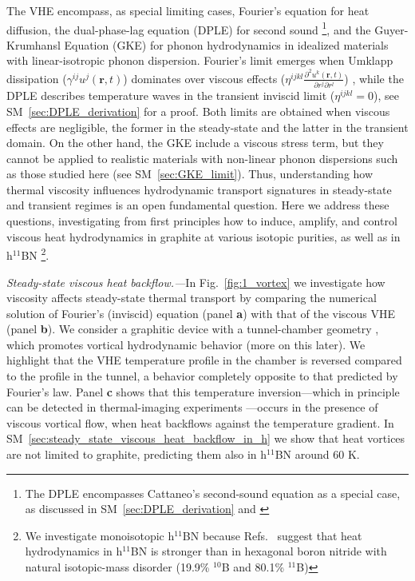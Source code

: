 \documentclass[
prb,
twocolumn,
superscriptaddress,
 amsmath,amssymb,
 aps,
longbibliography,
]{revtex4-2}
\begin{document}
The VHE encompass, as special limiting cases, Fou\-rier's equation for heat diffusion, the dual-phase-lag equation (DPLE) \cite{joseph_heat_1989,tzou_unified_1995} for second sound \footnote{The DPLE encompasses Cattaneo's second-sound equation \cite{cattaneo1958form} as a special case, as discussed in SM~\ref{sec:DPLE_derivation} and \cite{tzou_unified_1995}}, and the Guyer-Krumhansl Equation (GKE) \cite{guyer_solution_1966} for phonon hydrodynamics in idealized materials with linear-isotropic phonon dispersion.
Fourier's limit emerges when Umklapp dissipation ($\gamma^{ij}u^j(\bm{r}, t)$) dominates over viscous effects ($\eta^{ijkl}\tfrac{\partial^2 u^k(\bm{r}, t)}{\partial r^j \partial r^l}$) \cite{Simoncelli2020}, while the DPLE describes temperature waves in the transient inviscid limit ($\eta^{ijkl}{=}0$), see SM~\ref{sec:DPLE_derivation} for a proof. Both limits are obtained when viscous effects are negligible, the former in the steady-state and the latter in the transient domain.
On the other hand, the GKE include a viscous stress term, but they cannot be applied to realistic materials with non-linear phonon dispersions such as those studied here (see SM~\ref{sec:GKE_limit}).
Thus, understanding how thermal viscosity influences hydrodynamic transport signatures in steady-state and transient regimes is an open fundamental question.
Here we address these questions, investigating from first principles how to induce, amplify, and control viscous heat hydrodynamics in graphite at various isotopic purities, as well as in h$^{11}$BN \footnote{We investigate monoisotopic h$^{11}$BN because Refs.~\cite{yuan_modulating_2019,SimoncelliPhD} suggest that heat hydrodynamics in h$^{11}$BN is stronger than in hexagonal boron nitride with natural isotopic-mass disorder (19.9\% $^{10}$B and 80.1\% $^{11}$B)}.

\textit{Steady-state viscous heat backflow.---}In Fig.~\ref{fig:1_vortex} we investigate how viscosity affects steady-state thermal transport by comparing the numerical solution of Fourier's (inviscid) equation (panel \textbf{a}) with that of the viscous VHE (panel \textbf{b}). We consider a graphitic device with a tunnel-chamber geometry \cite{e-vortexes}, which promotes vortical hydrodynamic behavior (more on this later).
We highlight that the VHE temperature profile in the chamber is reversed compared to the profile in the tunnel, a behavior completely opposite to that predicted by Fourier's law. Panel \textbf{c} shows that this temperature inversion---which in principle can be detected in thermal-imaging experiments \cite{menges_nanoscale_2016,cheng_battery_2022,cahill_nanoscale_2014,braun_spatially_2022,ziabari_full-field_2018,reihaniQuantitativeMappingUnmodulated2022,goblotImagingHeatTransport2024}---occurs in the presence of viscous vortical flow, when heat backflows against the temperature gradient. In SM~\ref{sec:steady_state_viscous_heat_backflow_in_h} we show that heat vortices are not limited to graphite, predicting them also in h$^{11}$BN around 60 K.
\end{document}
